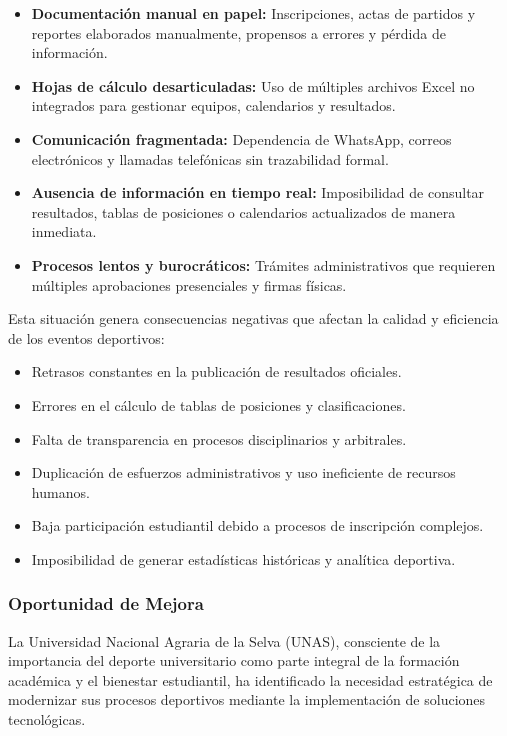 \documentclass[12pt,a4paper]{article}
\begin{document}
\begin{itemize}[noitemsep]
    \item \textbf{Documentación manual en papel:} Inscripciones, actas de partidos y reportes elaborados manualmente, propensos a errores y pérdida de información.
    \item \textbf{Hojas de cálculo desarticuladas:} Uso de múltiples archivos Excel no integrados para gestionar equipos, calendarios y resultados.
    \item \textbf{Comunicación fragmentada:} Dependencia de WhatsApp, correos electrónicos y llamadas telefónicas sin trazabilidad formal.
    \item \textbf{Ausencia de información en tiempo real:} Imposibilidad de consultar resultados, tablas de posiciones o calendarios actualizados de manera inmediata.
    \item \textbf{Procesos lentos y burocráticos:} Trámites administrativos que requieren múltiples aprobaciones presenciales y firmas físicas.
\end{itemize}

Esta situación genera consecuencias negativas que afectan la calidad y eficiencia de los eventos deportivos:

\begin{itemize}[noitemsep]
    \item Retrasos constantes en la publicación de resultados oficiales.
    \item Errores en el cálculo de tablas de posiciones y clasificaciones.
    \item Falta de transparencia en procesos disciplinarios y arbitrales.
    \item Duplicación de esfuerzos administrativos y uso ineficiente de recursos humanos.
    \item Baja participación estudiantil debido a procesos de inscripción complejos.
    \item Imposibilidad de generar estadísticas históricas y analítica deportiva.
\end{itemize}

\subsubsection{Oportunidad de Mejora}

La Universidad Nacional Agraria de la Selva (UNAS), consciente de la importancia del deporte universitario como parte integral de la formación académica y el bienestar estudiantil, ha identificado la necesidad estratégica de modernizar sus procesos deportivos mediante la implementación de soluciones tecnológicas.
\end{document}
